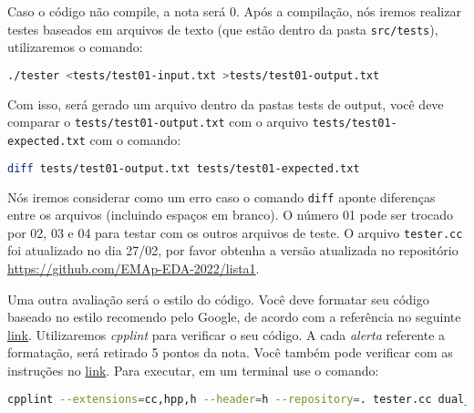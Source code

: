 \documentclass{article}
\begin{document}
Caso o código não compile, a nota será 0.
Após a compilação, nós iremos realizar testes baseados em arquivos de texto (que estão dentro da pasta \texttt{src/tests}), utilizaremos o comando:

\begin{lstlisting}[language=bash]
./tester <tests/test01-input.txt >tests/test01-output.txt
\end{lstlisting}
    
Com isso, será gerado um arquivo dentro da pastas tests de output, você deve comparar o \texttt{tests/test01-output.txt} com o arquivo \texttt{tests/test01-expected.txt} com o comando:

\begin{lstlisting}[language=bash]
diff tests/test01-output.txt tests/test01-expected.txt
\end{lstlisting}

Nós iremos considerar como um erro caso o comando \texttt{diff} aponte diferenças entre os arquivos (incluindo espaços em branco). 
O número 01 pode ser trocado por 02, 03 e 04 para testar com os outros arquivos de teste. O arquivo \texttt{tester.cc} foi atualizado no dia 27/02, por favor obtenha a versão atualizada no repositório \url{https://github.com/EMAp-EDA-2022/lista1}.

Uma outra avaliação será o estilo do código. Você deve formatar seu código baseado no estilo recomendo pelo  Google, de acordo com a referência no seguinte \href{https://google.github.io/styleguide/cppguide.html}{link}. 
%
Utilizaremos \textit{cpplint} para verificar o seu código. A cada \textit{alerta} referente a formatação, será retirado 5 pontos da nota. Você também pode verificar com as instruções no \href{https://github.com/cpplint/cpplint}{link}. Para executar, em um terminal use o comando:  

\begin{lstlisting}[language=bash]
cpplint --extensions=cc,hpp,h --header=h --repository=. tester.cc dual_list.h dual_list.hpp
\end{lstlisting}
\end{document}
